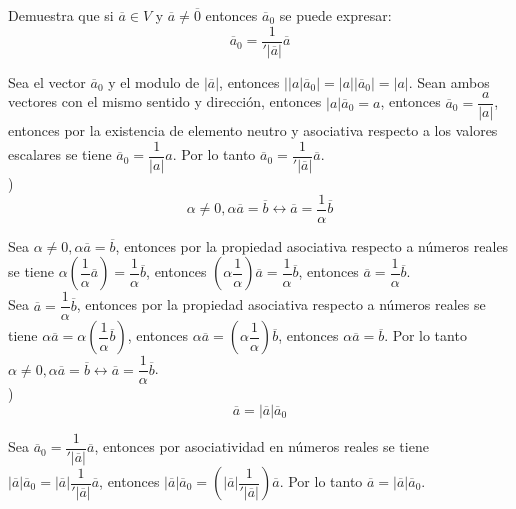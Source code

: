 \documentclass[11pt,a4paper]{article}
\begin{document}
\begin{justify}
\noindent
Demuestra que si $\overline{a} \in V$ y $\overline{a} \neq \overline{0}$ entonces $\overline{a}_0$ se puede expresar:\\

$$ \overline{a}_0 = \dfrac{1}{'\left|\overline{a}\right|}\overline{a}$$

Sea el vector $\overline{a}_0$ y el modulo de $|\overline{a}|$, entonces $||a|\overline{a}_0| =|a||\overline{a}_0| = |a|$. Sean ambos vectores con el mismo sentido y dirección, entonces $|a|\overline{a}_0= a$, entonces $\overline{a}_0 = \dfrac{a}{|a|}$, entonces por la existencia de elemento neutro y asociativa respecto a los valores escalares se tiene $\overline{a}_0 = \dfrac{1}{|a|}a$. Por lo tanto  $ \overline{a}_0 = \dfrac{1}{'\left|\overline{a}\right|}\overline{a}$.\\


)\\

$$\alpha \neq 0, \alpha \overline{a} = \overline{b} \leftrightarrow \overline{a} = \dfrac{1}{\alpha} \overline{b}  $$

\noindent
Sea $\alpha \neq 0, \alpha \overline{a} = \overline{b}$, entonces por la propiedad asociativa respecto a números reales se tiene $\alpha (\dfrac{1}{\alpha} \overline{a}) =\dfrac{1}{\alpha} \overline{b}$, entonces $(\alpha \dfrac{1}{\alpha}) \overline{a} = \dfrac{1}{\alpha} \overline{b}$, entonces $ \overline{a} = \dfrac{1}{\alpha} \overline{b}$.\\

\noindent
Sea $\overline{a} = \dfrac{1}{\alpha} \overline{b}$, entonces por la propiedad asociativa respecto a números reales se tiene $\alpha \overline{a} = \alpha (\dfrac{1}{\alpha} \overline{b})$, entonces $\alpha \overline{a} = (\alpha \dfrac{1}{\alpha}) \overline{b}$, entonces $\alpha \overline{a} =  \overline{b}$. Por lo tanto $\alpha \neq 0, \alpha \overline{a} = \overline{b} \leftrightarrow \overline{a} = \dfrac{1}{\alpha} \overline{b}  $.\\

)\\

$$ \overline{a} = |\overline{a}|\overline{a}_0 $$

Sea $\overline{a}_0 = \dfrac{1}{'\left|\overline{a}\right|}\overline{a}$, entonces por asociatividad en números reales se tiene $|\overline{a}|\overline{a}_0 = |\overline{a}|\dfrac{1}{'\left|\overline{a}\right|}\overline{a}$, entonces $|\overline{a}|\overline{a}_0 = (|\overline{a}|\dfrac{1}{'\left|\overline{a}\right|})\overline{a}$. Por lo tanto $ \overline{a} = |\overline{a}|\overline{a}_0 $.\\


\end{justify}
\end{document}
